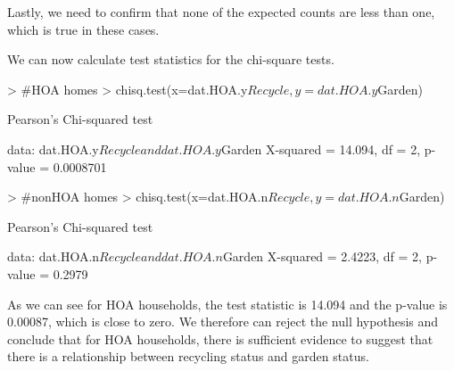 \documentclass{article}
\begin{document}
Lastly, we need to confirm that none of the expected counts are less than one, which is true in these cases. 

We can now calculate test statistics for the chi-square tests. 
\begin{Schunk}
\begin{Sinput}
> #HOA homes
> chisq.test(x=dat.HOA.y$Recycle,y=dat.HOA.y$Garden)
\end{Sinput}
\begin{Soutput}
	Pearson's Chi-squared test

data:  dat.HOA.y$Recycle and dat.HOA.y$Garden
X-squared = 14.094, df = 2, p-value = 0.0008701
\end{Soutput}
\begin{Sinput}
> #nonHOA homes
> chisq.test(x=dat.HOA.n$Recycle,y=dat.HOA.n$Garden)
\end{Sinput}
\begin{Soutput}
	Pearson's Chi-squared test

data:  dat.HOA.n$Recycle and dat.HOA.n$Garden
X-squared = 2.4223, df = 2, p-value = 0.2979
\end{Soutput}
\end{Schunk}
As we can see for HOA households, the test statistic is 14.094 and the p-value is 0.00087, which is close to zero. We therefore can reject the null hypothesis and conclude that for HOA households, there is sufficient evidence to suggest that there is a relationship between recycling status and garden status. 
\end{document}
